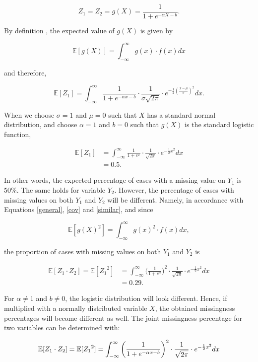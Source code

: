 \documentclass[]{interact}
\begin{document}
\[
Z_1 = Z_2 = g(X) = \frac{1}{1 + e^{-\alpha X - b}}.
\]

\noindent By definition \citep{Freund}, the expected value of $g(X)$ is given by 

\[
\mathbb{E}[g(X)] = \int_{-\infty}^\infty g(x) \cdot f(x) dx
\]

\noindent and therefore, 

\[
\mathbb{E}[Z_1] = \int_{-\infty}^\infty \frac{1}{1 + e^{-\alpha x - b}} \cdot \frac{1}{\sigma\sqrt{2\pi}}\cdot e^{-\frac{1}{2}(\frac{x - \mu}{\sigma})^2} dx.
\]

\noindent When we choose $\sigma = 1$ and $\mu = 0$ such that $X$ has a standard normal distribution, and choose $\alpha = 1$ and $b = 0$ such that $g(X)$ is the standard logistic function, 

\begin{align*}
\mathbb{E}[Z_1] & = \int_{-\infty}^\infty \frac{1}{1 + e^x} \cdot \frac{1}{\sqrt{2\pi}}\cdot e^{-\frac{1}{2}x^2} dx \nonumber \\
& = 0.5.
\end{align*}

\noindent In other words, the expected percentage of cases with a missing value on $Y_1$ is 50\%. The same holds for variable $Y_2$. However, the percentage of cases with missing values on both $Y_1$ and $Y_2$ will be different. Namely, in accordance with Equations \eqref{general}, \eqref{cov} and \eqref{similar}, and since 

\[
\mathbb{E}[{g(X)}^2] = \int_{-\infty}^\infty {g(x)}^2 \cdot f(x) dx, 
\]

\noindent the proportion of cases with missing values on both $Y_1$ and $Y_2$ is

\begin{align}
\mathbb{E}[Z_1 \cdot Z_2] = \mathbb{E}[{Z_1}^2] & = \int_{-\infty}^\infty {\bigg(\frac{1}{1 + e^x}\bigg)}^2 \cdot \frac{1}{\sqrt{2\pi}}\cdot e^{-\frac{1}{2}x^2} dx \nonumber \\
& = 0.29. \label{29}
\end{align}

\noindent For $\alpha \neq 1$ and $b \neq 0$, the logistic distribution will look different. Hence, if multiplied with a normally distributed variable $X$, the obtained missingness percentages will become different as well. The joint missingness percentage for two variables can be determined with: 

\begin{equation} \label{twovariables}
\mathbb{E}[Z_1 \cdot Z_2] = \mathbb{E}[{Z_1}^2] = \int_{-\infty}^\infty {\bigg(\frac{1}{1 + e^{-\alpha x - b}}\bigg)}^2 \cdot \frac{1}{\sqrt{2\pi}}\cdot e^{-\frac{1}{2}x^2} dx\\
\end{equation}
\end{document}
